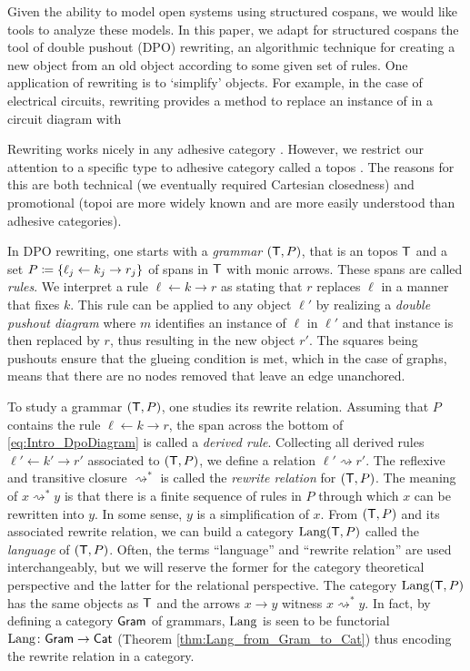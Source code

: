 \documentclass{amsart}
\begin{document}
Given the ability to model open systems using
structured cospans, we would like tools to analyze
these models. In this paper, we adapt for
structured cospans the tool of double pushout
(DPO) rewriting, an algorithmic technique for
creating a new object from an old object according
to some given set of rules. One application of
rewriting is to `simplify' objects. For example,
in the case of electrical circuits, rewriting
provides a method to replace an instance of
 in a circuit
diagram with 

Rewriting works nicely in any adhesive category
\cite{LackSobo_Adhesive}. However, we restrict our
attention to a specific type to adhesive category
called a topos \cite{LackSobo_TopsIsAdh}. The
reasons for this are both technical (we eventually
required Cartesian closedness) and promotional
(topoi are more widely known and are more easily
understood than adhesive categories).

In DPO rewriting, one starts with a \emph{grammar}
$ ( \mathsf{T},P ) $, that is an topos $ \mathsf{T} $ and a set
$ P \coloneqq \{ \ell_j \leftarrow k_j \to r_j \} $ of spans in $ \mathsf{T} $ with monic arrows. These
spans are called \emph{rules}. We interpret a rule
$ \ell \gets k \to r $ as stating that $ r $
replaces $ \ell $ in a manner that fixes $ k
$. This rule can be applied to any object
$ \ell' $ by realizing a \emph{double pushout
  diagram} 
where $ m $ identifies an instance of $ \ell $ in
$ \ell' $ and that instance is then replaced by
$ r $, thus resulting in the new object $ r'
$. The squares being pushouts ensure that the
glueing condition is met, which in the case of
graphs, means that there are no nodes removed
that leave an edge unanchored.

To study a grammar $ ( \mathsf{T} , P ) $, one studies its
rewrite relation. Assuming that $ P $ contains the
rule $ \ell \gets k \to r $, the span across the
bottom of \eqref{eq:Intro_DpoDiagram} is called a
\emph{derived rule}. Collecting all derived rules
$ \ell' \gets k' \to r' $ associated to
$ ( \mathsf{T},P ) $, we define a relation
$ \ell' \rightsquigarrow r' $.  The reflexive and
transitive closure $ \rightsquigarrow^\ast $ is called
the \emph{rewrite relation} for $ ( \mathsf{T},P ) $.  The
meaning of $ x \rightsquigarrow^\ast y $ is that
there is a finite sequence of rules in $ P $ through
which $ x $ can be rewritten into $ y $.  In some
sense, $ y $ is a simplification of $ x $. From
$ ( \mathsf{T},P ) $ and its associated rewrite relation,
we can build a category $ \mathrm{Lang} ( \mathsf{T},P ) $ called
the \emph{language} of $ (\mathsf{T},P) $. Often, the
terms ``language'' and ``rewrite relation'' are
used interchangeably, but we will reserve the
former for the category theoretical perspective
and the latter for the relational perspective.
The category $ \mathrm{Lang} (\mathsf{T},P) $ has the same objects
as $ \mathsf{T} $ and the arrows $ x \to y $ witness
$ x \rightsquigarrow^\ast y $. In fact, by
defining a category $ \mathsf{Gram} $ of grammars,
$ \mathrm{Lang} $ is seen to be functorial
$ \mathrm{Lang} \colon \mathsf{Gram} \to \mathsf{Cat} $ (Theorem
\ref{thm:Lang_from_Gram_to_Cat}) thus encoding the
rewrite relation in a category.
\end{document}
